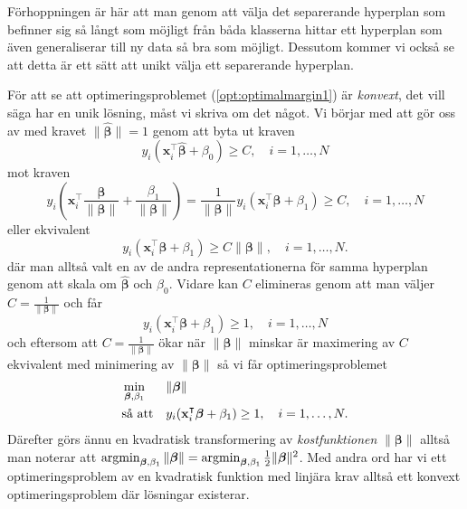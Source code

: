 \documentclass[a4paper, 12pt]{report}
\theoremstyle{definition}
\theoremstyle{remark}
\newcommand{\bfbeta}{{\boldsymbol{\beta}}}
\begin{document}
Förhoppningen är här att man genom att välja det separerande hyperplan som befinner sig så långt som möjligt från båda klasserna hittar ett hyperplan som även generaliserar till ny data så bra som möjligt. Dessutom kommer vi också se att detta är ett sätt att unikt välja ett separerande hyperplan.

För att se att optimeringsproblemet (\ref{opt:optimalmargin1}) är \textit{konvext}, det vill säga har en unik lösning, måst vi skriva om det något. Vi börjar med att gör oss av med kravet $\|\widehat{\bfbeta}\|=1$ genom att byta ut kraven
\begin{equation*}
y_i(\mathbf{x}_i^\intercal\widehat{\bfbeta}+\beta_0)\geq C,\quad i=1,\dots,N
\end{equation*}
mot kraven
\begin{equation*}
y_i\left(\mathbf{x}_i^\intercal\frac{\bfbeta}{\|\bfbeta\|}+\frac{\beta_1}{\|\bfbeta\|}\right) = 
\frac{1}{\|\bfbeta\|}y_i(\mathbf{x}_i^\intercal\bfbeta+\beta_1)
 \geq C,\quad i=1,\dots,N
\end{equation*}
eller ekvivalent
\begin{equation*}
y_i(\mathbf{x}_i^\intercal\bfbeta+\beta_1)\geq C\|\bfbeta\|,\quad i=1,\dots,N.
\end{equation*}
där man alltså valt en av de andra representationerna för samma hyperplan genom att skala om $\widehat{\bfbeta}$ och $\beta_0$. Vidare kan $C$ elimineras genom att man väljer $C=\frac{1}{\|\bfbeta\|}$ och får
\begin{equation*}
y_i(\mathbf{x}_i^\intercal\bfbeta+\beta_1)\geq 1,\quad i=1,\dots,N
\end{equation*}
och eftersom att $C=\frac{1}{\|\bfbeta\|}$ ökar när $\|\bfbeta\|$ minskar är maximering av $C$ ekvivalent med minimering av $\|\bfbeta\|$ så vi får optimeringsproblemet
\begin{equation*}%
\begin{aligned}
& \operatornamewithlimits{min}_{\bfbeta,\beta_1} & & \|\bfbeta\|\\
& \text{så att} & & y_i(\mathbf{x}_i^\intercal\bfbeta+\beta_1)\geq 1,\quad i=1,\dots,N.
\end{aligned}
\end{equation*}
Därefter görs ännu en kvadratisk transformering av \textit{kostfunktionen} $\|\bfbeta\|$ alltså man noterar att $\operatornamewithlimits{argmin}_{\bfbeta,\beta_1} \|\bfbeta\|=\operatornamewithlimits{argmin}_{\bfbeta,\beta_1} \frac{1}{2}\|\bfbeta\|^2$. Med andra ord har vi ett optimeringsproblem av en kvadratisk funktion med linjära krav alltså ett konvext optimeringsproblem där lösningar existerar.
\end{document}
